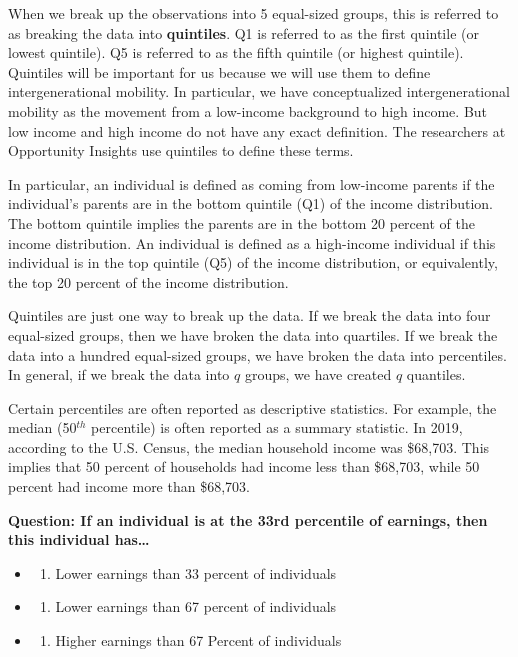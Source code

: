 \documentclass[
]{book}
\providecommand{\tightlist}{%
  \setlength{\itemsep}{0pt}\setlength{\parskip}{0pt}}
\begin{document}
When we break up the observations into 5 equal-sized groups, this is referred to as breaking the data into \textbf{quintiles}. Q1 is referred to as the first quintile (or lowest quintile). Q5 is referred to as the fifth quintile (or highest quintile). Quintiles will be important for us because we will use them to define intergenerational mobility. In particular, we have conceptualized intergenerational mobility as the movement from a low-income background to high income. But low income and high income do not have any exact definition. The researchers at Opportunity Insights use quintiles to define these terms.

In particular, an individual is defined as coming from low-income parents if the individual's parents are in the bottom quintile (Q1) of the income distribution. The bottom quintile implies the parents are in the bottom 20 percent of the income distribution. An individual is defined as a high-income individual if this individual is in the top quintile (Q5) of the income distribution, or equivalently, the top 20 percent of the income distribution.

Quintiles are just one way to break up the data. If we break the data into four equal-sized groups, then we have broken the data into quartiles. If we break the data into a hundred equal-sized groups, we have broken the data into percentiles. In general, if we break the data into \(q\) groups, we have created \(q\) quantiles.

Certain percentiles are often reported as descriptive statistics. For example, the median (50\(^{th}\) percentile) is often reported as a summary statistic. In 2019, according to the U.S. Census, the median household income was \$68,703. This implies that 50 percent of households had income less than \$68,703, while 50 percent had income more than \$68,703.

\textbf{Question: If an individual is at the 33rd percentile of earnings, then this individual has\ldots{}}

\begin{itemize}
\tightlist
\item
  \begin{enumerate}
  \def\labelenumi{(\Alph{enumi})}
  \tightlist
  \item
    Lower earnings than 33 percent of individuals\\
  \end{enumerate}
\item
  \begin{enumerate}
  \def\labelenumi{(\Alph{enumi})}
  \setcounter{enumi}{1}
  \tightlist
  \item
    Lower earnings than 67 percent of individuals\\
  \end{enumerate}
\item
  \begin{enumerate}
  \def\labelenumi{(\Alph{enumi})}
  \setcounter{enumi}{2}
  \tightlist
  \item
    Higher earnings than 67 Percent of individuals
  \end{enumerate}
\end{itemize}
\end{document}
